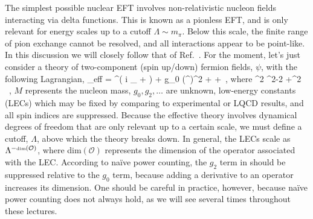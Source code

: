 The simplest possible nuclear EFT involves non-relativistic nucleon fields interacting via delta functions. This is known as a pionless EFT, and is only relevant for energy scales up to a cutoff $\Lambda \sim m_{\pi}$. Below this scale, the finite range of pion exchange cannot be resolved, and all interactions appear to be point-like. In this discussion we will closely follow that of Ref.~\cite{Kaplan:2005es}. For the moment, let's just consider a theory of two-component (spin up/down) fermion fields, $\psi$, with the following Lagrangian,
\beq
\label{eq:leff}
_{\mbox{\tiny eff}} = \psi^{\dagger}\left( i \partial_{\tau} + \right) \psi + g_0 \left(\psi^{\dagger}\psi\right)^2 + +\cdots \ ,
\eeq
where
\beq
\overleftrightarrow{\nabla}^2 \equiv \overleftarrow{\nabla}^2-2\overleftarrow{\nabla} \cdot \overrightarrow{\nabla}+\overrightarrow{\nabla}^2 \ ,
\eeq
$M$ represents the nucleon mass, $g_0, g_2, \ldots$ are unknown, low-energy constants (LECs) which may be fixed by comparing to experimental or LQCD results, and all spin indices are suppressed. Because the effective theory involves dynamical degrees of freedom that are only relevant up to a certain scale, we must define a cutoff, $\Lambda$, above which the theory breaks down. In general, the LECs scale as $\Lambda^{-\mbox{\tiny dim}(\mathcal{O})}$, where dim$(\mathcal{O})$ represents the dimension of the operator associated with the LEC. According to na\"ive power counting, the $g_2$ term in  should be suppressed relative to the $g_0$ term, because adding a derivative to an operator increases its dimension. One should be careful in practice, however, because na\"ive power counting does not always hold, as we will see several times throughout these lectures. 

